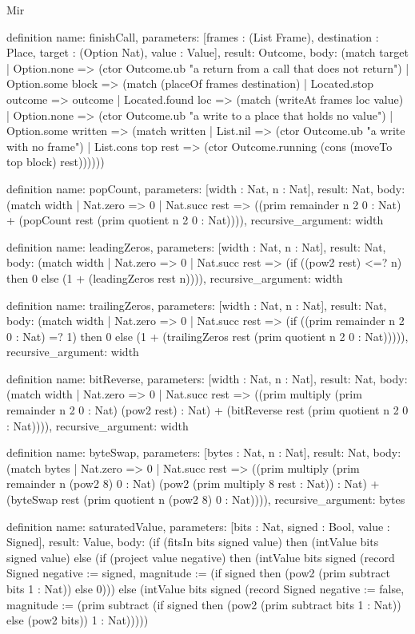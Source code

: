 \begin{lexlean}{Mir}
\begin{semanticmodule}
definition{
  name: finishCall,
  parameters: [frames : (List Frame), destination : Place, target : (Option Nat), value : Value],
  result: Outcome,
  body: (match target
    | Option.none => (ctor Outcome.ub "a return from a call that does not return")
    | Option.some block => (match (placeOf frames destination)
      | Located.stop outcome => outcome
      | Located.found loc => (match (writeAt frames loc value)
        | Option.none => (ctor Outcome.ub "a write to a place that holds no value")
        | Option.some written => (match written
          | List.nil => (ctor Outcome.ub "a write with no frame")
          | List.cons top rest => (ctor Outcome.running (cons (moveTo top block) rest))))))
}

definition{
  name: popCount,
  parameters: [width : Nat, n : Nat],
  result: Nat,
  body: (match width
    | Nat.zero => 0
    | Nat.succ rest => ((prim remainder n 2 0 : Nat) + (popCount rest (prim quotient n 2 0 : Nat)))),
  recursive_argument: width
}

definition{
  name: leadingZeros,
  parameters: [width : Nat, n : Nat],
  result: Nat,
  body: (match width
    | Nat.zero => 0
    | Nat.succ rest => (if ((pow2 rest) <=? n) then 0 else (1 + (leadingZeros rest n)))),
  recursive_argument: width
}

definition{
  name: trailingZeros,
  parameters: [width : Nat, n : Nat],
  result: Nat,
  body: (match width
    | Nat.zero => 0
    | Nat.succ rest => (if ((prim remainder n 2 0 : Nat) =? 1) then 0 else (1 + (trailingZeros rest (prim quotient n 2 0 : Nat))))),
  recursive_argument: width
}

definition{
  name: bitReverse,
  parameters: [width : Nat, n : Nat],
  result: Nat,
  body: (match width
    | Nat.zero => 0
    | Nat.succ rest => ((prim multiply (prim remainder n 2 0 : Nat) (pow2 rest) : Nat) + (bitReverse rest (prim quotient n 2 0 : Nat)))),
  recursive_argument: width
}

definition{
  name: byteSwap,
  parameters: [bytes : Nat, n : Nat],
  result: Nat,
  body: (match bytes
    | Nat.zero => 0
    | Nat.succ rest => ((prim multiply (prim remainder n (pow2 8) 0 : Nat) (pow2 (prim multiply 8 rest : Nat)) : Nat) + (byteSwap rest (prim quotient n (pow2 8) 0 : Nat)))),
  recursive_argument: bytes
}

definition{
  name: saturatedValue,
  parameters: [bits : Nat, signed : Bool, value : Signed],
  result: Value,
  body: (if (fitsIn bits signed value) then (intValue bits signed value) else (if (project value negative) then (intValue bits signed (record Signed {negative := signed, magnitude := (if signed then (pow2 (prim subtract bits 1 : Nat)) else 0)})) else (intValue bits signed (record Signed {negative := false, magnitude := (prim subtract (if signed then (pow2 (prim subtract bits 1 : Nat)) else (pow2 bits)) 1 : Nat)}))))
}


\end{semanticmodule}
\end{lexlean}
